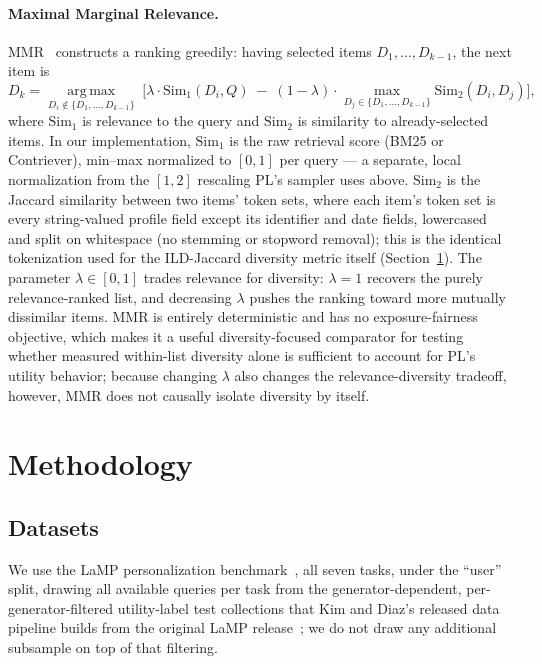 \documentclass[11pt]{article}
\newcommand{\ild}{\ensuremath{\mathrm{ILD}}}
\begin{document}
\paragraph{Maximal Marginal Relevance.} MMR~\citep{carbonell1998mmr}
constructs a ranking greedily: having selected items $D_1,\dots,D_{k-1}$,
the next item is
\[
D_k = \operatorname*{arg\,max}_{D_i \notin \{D_1,\dots,D_{k-1}\}}\;
\Big[\lambda\cdot\mathrm{Sim}_1(D_i, Q) \;-\; (1-\lambda)\cdot
\max_{D_j \in \{D_1,\dots,D_{k-1}\}} \mathrm{Sim}_2(D_i, D_j)\Big],
\]
where $\mathrm{Sim}_1$ is relevance to the query and $\mathrm{Sim}_2$ is
similarity to already-selected items. In our implementation, $\mathrm{Sim}_1$
is the raw retrieval score (BM25 or Contriever), min--max normalized to
$[0,1]$ per query --- a separate, local normalization from the $[1,2]$
rescaling PL's sampler uses above. $\mathrm{Sim}_2$ is the Jaccard
similarity between two items' token sets, where each item's token set is
every string-valued profile field except its identifier and date fields,
lowercased and split on whitespace (no stemming or stopword removal); this
is the identical tokenization used for the \ild{}-Jaccard diversity metric
itself (Section~\ref{sec:methodology}). The parameter $\lambda\in[0,1]$
trades relevance for diversity: $\lambda=1$ recovers the purely
relevance-ranked list, and decreasing $\lambda$ pushes the ranking toward
more mutually dissimilar items. MMR is entirely deterministic and has no
exposure-fairness objective, which makes it a useful diversity-focused
comparator for testing whether measured within-list diversity alone is
sufficient to account for PL's utility behavior; because changing
$\lambda$ also changes the relevance-diversity tradeoff, however, MMR does
not causally isolate diversity by itself.

\section{Methodology}
\label{sec:methodology}

\subsection{Datasets}

We use the LaMP personalization benchmark~\citep{salemi2024lamp}, all
seven tasks, under the ``user'' split, drawing all available queries per
task from the generator-dependent, per-generator-filtered utility-label
test collections that Kim and Diaz's released data pipeline builds from
the original LaMP release~\citep{kim2025fairrag}; we do not draw any
additional subsample on top of that filtering.
\end{document}
